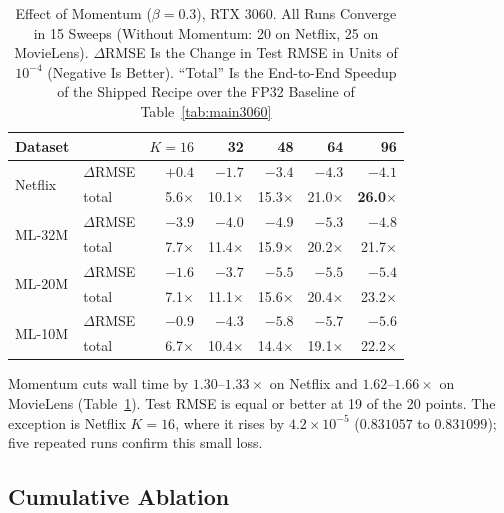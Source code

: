 \begin{table}[!t]
\caption{Effect of Momentum ($\beta=0.3$), RTX 3060. All Runs Converge in 15 Sweeps (Without Momentum: 20 on Netflix, 25 on MovieLens). $\Delta$RMSE Is the Change in Test RMSE in Units of $10^{-4}$ (Negative Is Better). ``Total'' Is the End-to-End Speedup of the Shipped Recipe over the FP32 Baseline of Table~\ref{tab:main3060}}
\label{tab:momentum}
\centering
\footnotesize
\renewcommand{\arraystretch}{1.02}
\setlength{\tabcolsep}{4pt}
\begin{tabular}{llrrrrr}
\toprule
\textbf{Dataset} & & \textbf{$K{=}16$} & \textbf{32} & \textbf{48} & \textbf{64} & \textbf{96} \\
\midrule
\multirow{2}{*}{Netflix}
 & $\Delta$RMSE   & $+0.4$ & $-1.7$ & $-3.4$ & $-4.3$ & $-4.1$ \\
 & total          & 5.6$\times$ & 10.1$\times$ & 15.3$\times$ & 21.0$\times$ & \textbf{26.0$\times$} \\
\midrule
\multirow{2}{*}{ML-32M}
 & $\Delta$RMSE   & $-3.9$ & $-4.0$ & $-4.9$ & $-5.3$ & $-4.8$ \\
 & total          & 7.7$\times$ & 11.4$\times$ & 15.9$\times$ & 20.2$\times$ & 21.7$\times$ \\
\midrule
\multirow{2}{*}{ML-20M}
 & $\Delta$RMSE   & $-1.6$ & $-3.7$ & $-5.5$ & $-5.5$ & $-5.4$ \\
 & total          & 7.1$\times$ & 11.1$\times$ & 15.6$\times$ & 20.4$\times$ & 23.2$\times$ \\
\midrule
\multirow{2}{*}{ML-10M}
 & $\Delta$RMSE   & $-0.9$ & $-4.3$ & $-5.8$ & $-5.7$ & $-5.6$ \\
 & total          & 6.7$\times$ & 10.4$\times$ & 14.4$\times$ & 19.1$\times$ & 22.2$\times$ \\
\bottomrule
\end{tabular}
\end{table}

Momentum cuts wall time by $1.30$--$1.33\times$ on Netflix and $1.62$--$1.66\times$ on MovieLens (Table~\ref{tab:momentum}). Test RMSE is equal or better at 19 of the 20 points. The exception is Netflix $K=16$, where it rises by $4.2 \times 10^{-5}$ ($0.831057$ to $0.831099$); five repeated runs confirm this small loss.

\subsection{Cumulative Ablation}
\label{ssec:ablation}

